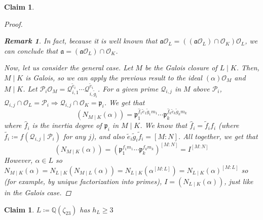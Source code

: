 \documentclass[11pt]{article}
\newtheorem{claim}[theorem]{Claim}
\theoremstyle{definition}
\newtheorem*{rk}{Remark}
\begin{document}
\begin{claim}
\begin{proof}
            \begin{rk}
                In fact, because it is well known that
                $\mathfrak{a}\mathcal{O}_L =
                ((\mathfrak{a}\mathcal{O}_L)\cap \mathcal{O}_K)\mathcal{O}_L$,
                we can conclude that
                $\mathfrak{a} = (\mathfrak{a}\mathcal{O}_L)\cap \mathcal{O}_K$.
            \end{rk}

            \noindent Now, let us consider the general case.
            Let $M$ be the Galois closure of $L \mid K$.
            Then, $M \mid K$ is Galois,
            so we can apply the previous result to the ideal $(\alpha)\mathcal{O}_M$ and $M \mid K$.
            Let $\mathcal{P}_i\mathcal{O}_M = \mathcal{Q}_{i, 1}^{\tilde{e}_i} \cdots \mathcal{Q}_{i, \tilde{g}_i}^{\tilde{e}_i}$.
            For a given prime $\mathcal{Q}_{i, j}$ in $M$ above $\mathcal{P}_i$,
            $\mathcal{Q}_{i, j} \cap \mathcal{O}_L = \mathcal{P}_{i}
            \Rightarrow \mathcal{Q}_{i, j} \cap \mathcal{O}_K = \mathfrak{p}_i$.
            We get that
            \[
                (N_{M \mid K}(\alpha)) = \mathfrak{p}_1^{\hat{f}_1 \tilde{e}_1 \tilde{g}_1 m_1} \cdots \mathfrak{p}_k^{\hat{f}_k \tilde{e}_k \tilde{g}_k m_k}
            \]
            where $\hat{f}_i$ is the inertia degree of $\mathfrak{p}_i$ in $M \mid K$.
            We know that $\hat{f}_i = \tilde{f}_i f_i$
            (where $\tilde{f_i} \coloneqq f(\mathcal{Q}_{i, j} \mid \mathcal{P}_i)$ for any $j$),
            and also $\tilde{e}_i \tilde{g}_i \tilde{f}_i = [M : N]$.
            All together, we get that
            \[
                (N_{M \mid K}(\alpha)) = (\mathfrak{p}_1^{f_1 m_1} \cdots \mathfrak{p}_k^{f_k m_k})^{[M : N]} = I^{[M : N]}
            \]
            However,
            $\alpha \in L$ so
            $N_{M \mid K}(\alpha) = N_{L \mid K}(N_{M \mid L}(\alpha)) =
            N_{L \mid K}(\alpha^{[M : L]}) = N_{L \mid K}(\alpha)^{[M : L]}$
            so (for example, by unique factorization into primes),
            $I = (N_{L \mid K}(\alpha))$, just like in the Galois case.
        \end{proof}
    \end{claim}

    \begin{claim}
        $L \coloneqq \mathbb{Q}(\zeta_{23})$ has $h_L \geq 3$

    \end{claim}
\end{document}
